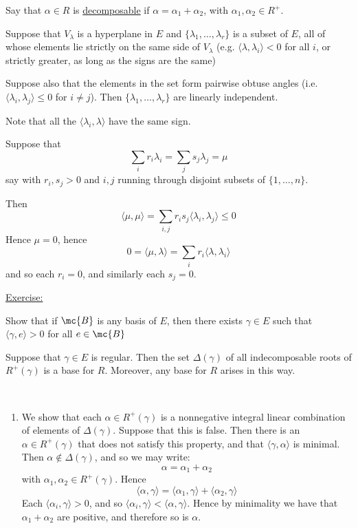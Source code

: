 \documentclass[x11names,reqno,14pt]{extarticle}
\begin{document}
Say that $\alpha\in R$ is \underline{decomposable} if $\alpha = \alpha_1 + \alpha_2$, with $\alpha_1,\alpha_2 \in R^+$. 

\lem

Suppose that $V_\lambda$ is a hyperplane in $E$ and $\{\lambda_1,\dots,\lambda_r\}$ is a subset of $E$, all of whose elements lie strictly on the same side of $V_\lambda$ (e.g. $\langle\lambda,\lambda_i\rangle < 0$ for all $i$, or strictly greater, as long as the signs are the same)

Suppose also that the elements in the set form pairwise obtuse angles (i.e. $\langle\lambda_i,\lambda_j\rangle\leq0$ for $i\neq j$). Then $\{\lambda_1,\dots,\lambda_r\}$ are linearly independent. 

\proof

Note that all the $\langle\lambda_i,\lambda\rangle$ have the same sign. 

Suppose that 
\[
\sum_i r_i\lambda_i = \sum_j s_j\lambda_j = \mu
\]
say with $r_i,s_j>0$ and $i, j$ running through disjoint subsets of $\{1, \dots, n\}$. 

Then 
\[
\langle\mu,\mu\rangle = \sum_{i,j} r_is_j\langle\lambda_i,\lambda_j\rangle \leq 0
\]
Hence $\mu = 0$, hence
\[
0=\langle\mu,\lambda\rangle = \sum_ir_i\langle\lambda,\lambda_i\rangle
\]
and so each $r_i = 0$, and similarly each $s_j = 0$.

\underline{Exercise:}

Show that if $\mc{B}$ is any basis of $E$, then there exists $\gamma\in E$ such that $\langle\gamma,e\rangle > 0$ for all $e\in\mc{B}$

\thm

Suppose that $\gamma\in E$ is regular. Then the set $\Delta(\gamma)$ of all indecomposable roots of $R^+(\gamma)$ is a base for $R$. Moreover, any base for $R$ arises in this way. 

\proof
\,

\begin{enumerate}[label=(\alph*)]

\item We show that each $\alpha\in R^+(\gamma)$ is a nonnegative integral linear combination of elements of $\Delta(\gamma)$. Suppose that this is false. Then there is an $\alpha\in R^+(\gamma)$ that does not satisfy this property, and that $\langle\gamma,\alpha\rangle$ is minimal. Then $\alpha\not\in\Delta(\gamma)$, and so we may write: 
\[
\alpha = \alpha_1 + \alpha_2
\]
with $\alpha_1,\alpha_2 \in R^+(\gamma)$. Hence 
\[
\langle\alpha,\gamma\rangle = \langle\alpha_1,\gamma\rangle + \langle\alpha_2,\gamma\rangle
\]
Each $\langle\alpha_i,\gamma\rangle>0$, and so $\langle\alpha_i,\gamma\rangle<\langle\alpha,\gamma\rangle$. Hence by minimality we have that $\alpha_1 + \alpha_2$ are positive, and therefore so is $\alpha$. 

\end{enumerate}
\end{document}
